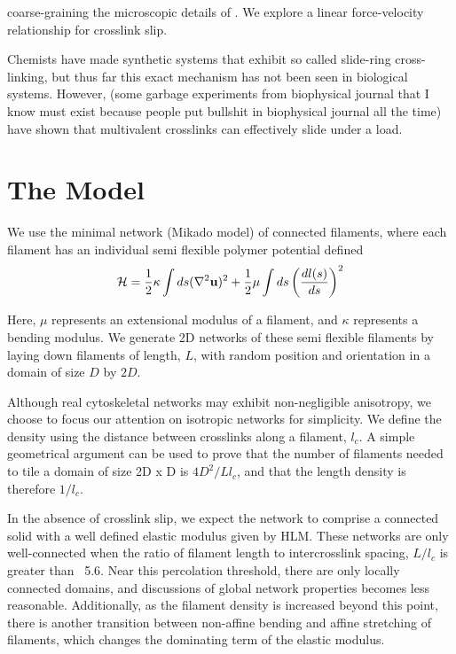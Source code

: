 \documentclass[prb,11pt]{revtex4-1}
\begin{document}
coarse-graining the microscopic details of .  We explore a linear force-velocity relationship for crosslink slip. 

Chemists have made synthetic systems that exhibit so called slide-ring cross-linking, but thus far this exact mechanism has not been seen in biological systems.  However, (some garbage experiments from biophysical journal that I know must exist because people put bullshit in biophysical journal all the time) have shown that multivalent crosslinks can effectively slide under a load.


\section{The Model}

We use the minimal network (Mikado model) of connected filaments, where each filament has an individual semi flexible polymer potential defined
\begin{equation}
{\cal H} =\frac{1}{2}\kappa \int ds(\nabla^2\mathbf{u})^2 + \frac{1}{2}\mu \int ds \left ( \frac{dl(s) }{ds} \right )^2
\end{equation}

Here, $\mu$ represents an extensional modulus of a filament, and $\kappa$ represents a bending modulus.  We generate 2D networks of these semi flexible filaments by laying down filaments of length, $L$, with random position and orientation in a domain of size $D$ by $2D$.  

Although real cytoskeletal networks may exhibit non-negligible anisotropy, we choose to focus our attention on isotropic networks for simplicity.  We define the density using the distance between crosslinks along a filament, $l_c$. A simple geometrical argument can be used to prove that the number of filaments needed to tile a domain of size 2D x D is $4D^2/Ll_c$, and that the length density is therefore $1/l_c$. 

In the absence of crosslink slip, we expect the network to comprise a connected solid with a well defined elastic modulus given by HLM.  These networks are only well-connected when the ratio of filament length to intercrosslink spacing, $L/l_c$ is greater than ~5.6.  Near this percolation threshold, there are only locally connected domains, and discussions of global network properties becomes less reasonable.  Additionally, as the filament density is increased beyond this point, there is another transition between non-affine bending and affine stretching of filaments, which changes the dominating term of the elastic modulus.
\end{document}
